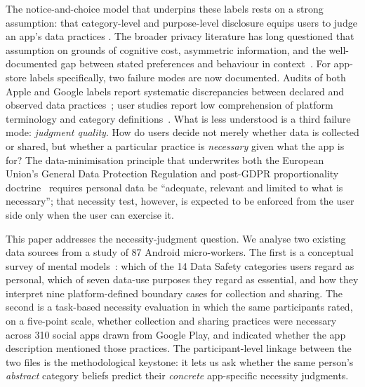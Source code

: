 \documentclass[11pt,a4paper]{article}
\begin{document}


The notice-and-choice model that underpins these labels rests on a strong
assumption: that category-level and purpose-level disclosure equips users
to judge an app's data practices
\citep{solove:2013,mcdonald:cranor:2008,cranor:2012}. The broader privacy
literature has long questioned that assumption on grounds of cognitive
cost, asymmetric information, and the well-documented gap between stated
preferences and behaviour in context~\citep{acquisti:etal:2015,
acquisti:etal:2017,acquisti:grossklags:2005,brandimarte:etal:2013}. For
app-store labels specifically, two failure modes are now documented.
Audits of both Apple and Google labels report systematic discrepancies
between declared and observed data practices~\citep{kollnig:etal:2022,
koch:etal:2022,bhagavatula:etal:2023}; user studies report low
comprehension of platform terminology and category
definitions~\citep{kelley:etal:2010,zhang:etal:2022,reidenberg:etal:2015}.
What is less understood is a third failure mode: \emph{judgment quality}.
How do users decide not merely whether data is collected or shared, but
whether a particular practice is \emph{necessary} given what the app is
for? The data-minimisation principle that underwrites both the European
Union's General Data Protection Regulation and post-GDPR proportionality
doctrine~\citep{gdpr:2016} requires personal data be ``adequate, relevant
and limited to what is necessary''; that necessity test, however, is
expected to be enforced from the user side only when the user can
exercise it.

This paper addresses the necessity-judgment question. We analyse two
existing data sources from a study of 87 Android micro-workers. The first
is a conceptual survey of mental models~\citep{wash:2010,lin:etal:2012,
kang:etal:2015}: which of the 14 Data Safety categories users regard as
personal, which of seven data-use purposes they regard as essential, and
how they interpret nine platform-defined boundary cases for collection and
sharing. The second is a task-based necessity evaluation in which the
same participants rated, on a five-point scale, whether collection and
sharing practices were necessary across 310 social apps drawn from
Google Play, and indicated whether the app description mentioned those
practices. The participant-level linkage between the two files is the
methodological keystone: it lets us ask whether the same person's
\emph{abstract} category beliefs predict their \emph{concrete}
app-specific necessity judgments.
\end{document}
